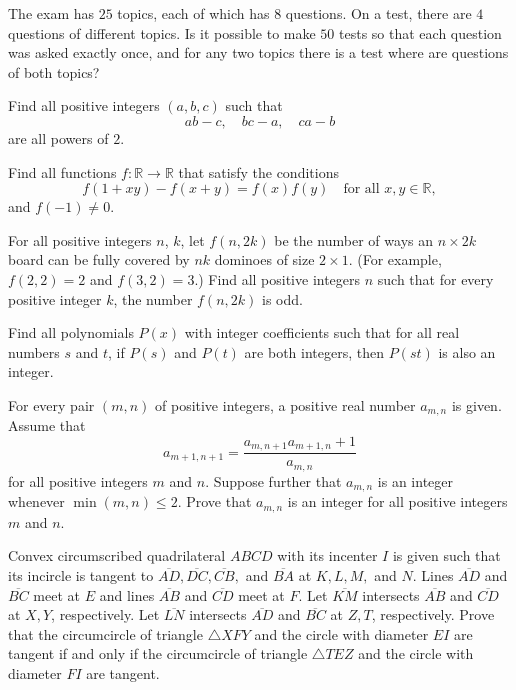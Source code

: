 \documentclass[11pt]{scrartcl}
\begin{document}
\begin{problem}[5101270312905584526]
The exam has $25$ topics, each of which has $8$ questions. On a test, there are $4$ questions of different topics.
Is it possible to make $50$ tests so that each question was asked exactly once, and for any two topics there is a test where are questions of both topics?
\end{problem}
\begin{problem}[5113543632741494138]
Find all positive integers $(a,b,c)$ such that
$$ab-c,\quad bc-a,\quad ca-b$$are all powers of $2$.
\end{problem}
\begin{problem}[5129113369150286745]
Find all functions $f:\mathbb{R} \rightarrow \mathbb{R}$ that satisfy the conditions
\[f(1+xy)-f(x+y)=f(x)f(y) \quad \text{for all } x,y \in \mathbb{R},\]
and $f(-1) \neq 0$.
\end{problem}
\begin{problem}[5135909621527561588]
For all positive integers $n$, $k$, let $f(n, 2k)$ be the number of ways an $n \times 2k$ board can be fully covered by $nk$ dominoes of size $2 \times 1$. (For example, $f(2, 2)=2$ and $f(3, 2)=3$.) Find all positive integers $n$ such that for every positive integer $k$, the number $f(n, 2k)$ is odd.
\end{problem}
\begin{problem}[5173505438503336781]
Find all polynomials $P(x)$ with integer coefficients such that for all real numbers $s$ and $t$, if $P(s)$ and $P(t)$ are both integers, then $P(st)$ is also an integer.
\end{problem}
\begin{problem}[5180896359975323937]
For every pair $(m, n)$ of positive integers, a positive real number $a_{m, n}$ is given. Assume that
\[a_{m+1, n+1} = \frac{a_{m, n+1} a_{m+1, n} + 1}{a_{m, n}}\]for all positive integers $m$ and $n$. Suppose further that $a_{m, n}$ is an integer whenever $\min(m, n) \le 2$. Prove that $a_{m, n}$ is an integer for all positive integers $m$ and $n$.
\end{problem}
\begin{problem}[5182115879210719670]
	Convex circumscribed quadrilateral $ABCD$ with its incenter $I$ is given such that its incircle is tangent to $\overline{AD},\overline{DC},\overline{CB},$ and $\overline{BA}$ at $K,L,M,$ and $N$. Lines $\overline{AD}$ and $\overline{BC}$ meet at $E$ and lines $\overline{AB}$ and $\overline{CD}$ meet at $F$. Let $\overline{KM}$ intersects $\overline{AB}$ and $\overline{CD}$ at $X,Y$, respectively. Let $\overline{LN}$ intersects $\overline{AD}$ and $\overline{BC}$ at $Z,T$, respectively. Prove that the circumcircle of triangle $\triangle XFY$ and the circle with diameter $EI$ are tangent if and only if the circumcircle of triangle $\triangle TEZ$ and the circle with diameter $FI$ are tangent.
\end{problem}
\end{document}
